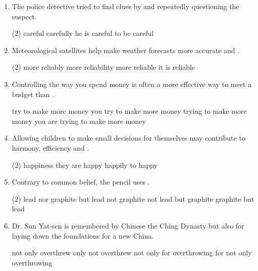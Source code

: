 \begin{enumerate}
\item The police detective tried to find clues by \ttu and repeatedly questioning the suspect.
\begin{tasks}(2)
  \task careful
  \task carefully
  \task he is careful
  \task to be careful
\end{tasks}

\item Meteorological satellites help make weather forecasts more accurate and \ttu.
\begin{tasks}(2)
  \task more reliably
  \task more reliability
  \task more reliable
  \task it is reliable
\end{tasks}

\item Controlling the way you spend money is often a more effective way to meet a budget than \ttu.
\begin{tasks}
  \task try to make more money
  \task you try to make more money
  \task trying to make more money
  \task you are trying to make more money
\end{tasks}

\item Allowing children to make small decisions for themselves may contribute to harmony, efficiency and \ttu.
\begin{tasks}(2)
  \task happiness
  \task they are happy
  \task happily
  \task to happy
\end{tasks}

\item Contrary to common belief, the pencil uses \ttu.
\begin{tasks}(2)
  \task lead nor graphite
  \task but lead not graphite
  \task not lead but graphite
  \task graphite but lead
\end{tasks}

\item Dr. Sun Yat-sen is remembered by Chinese \ttu the Ching Dynasty but also for laying down the foundations for a new China.
\begin{tasks}
  \task not only overthrew
  \task only not overthrew
  \task not only for overthrowing
  \task for not only overthrowing
\end{tasks}

\end{enumerate}

